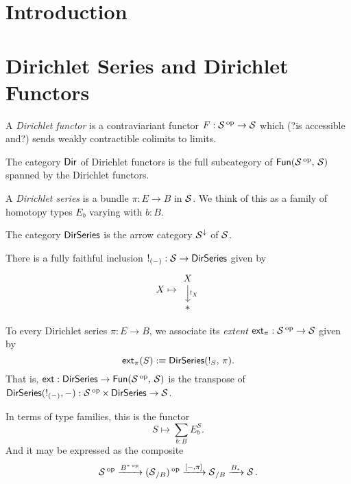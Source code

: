\section{Introduction}


\section{Dirichlet Series and Dirichlet Functors}

\begin{defn}
A \emph{Dirichlet functor} is a contraviariant functor $F : \Sa\op \to \Sa$
which (?is accessible and?) sends weakly contractible colimits to limits.

The category $\Dir$ of Dirichlet functors is the full subcategory of
$\Fun(\Sa\op,\, \Sa)$ spanned by the Dirichlet functors.
\end{defn}

\begin{defn}
A \emph{Dirichlet series} is a bundle $\pi : E \to B$ in $\Sa$. We think of this
as a family of homotopy types $E_b$ varying with $b : B$.

The category $\DirSeries$ is the arrow category $\Sa^{\downarrow}$ of $\Sa$.
\end{defn}

\begin{prop}
  There is a fully faithful inclusion $\bang_{(-)} : \Sa \to \DirSeries$ given by
  $$X \mapsto \begin{tikzcd} X \arrow[d, "!_X"] \\ \ast \end{tikzcd}$$
\end{prop}

\begin{defn}
To every Dirichlet series $\pi : E \to B$, we associate its \emph{extent}
$\term{ext}_{\pi} : \Sa\op \to \Sa$ given by
$$\term{ext}_{\pi}(S) :\equiv \DirSeries(\bang_S,\, \pi).$$
That is, $\term{ext} : \DirSeries \to \Fun(\Sa\op,\, \Sa)$ is the transpose of
$\DirSeries(\bang_{(-)}, -) : \Sa\op \times \DirSeries \to \Sa$.

In terms of type families, this is the functor
$$S \mapsto \sum_{b : B} E_b^S.$$
And it may be expressed as the composite
$$\Sa\op \xto{B^{\ast}\op} (\Sa_{/B})\op \xto{[-,\pi]} \Sa_{/B} \xto{B_{\ast}}
\Sa.$$
\end{defn}




